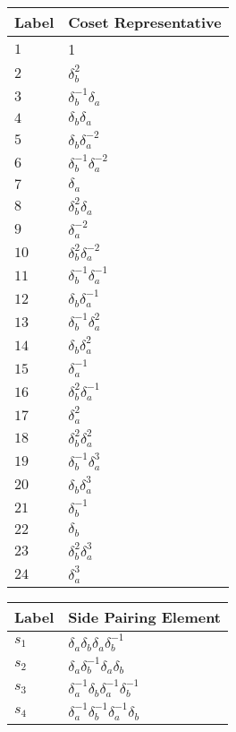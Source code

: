 \documentclass{article}
\begin{document}

\begin{center}
\begin{tabular}{ll}
\toprule
Label & Coset Representative\\
\midrule
$1$ & 1 \\
$2$ & $\delta_b^{2}$ \\
$3$ & $\delta_b^{-1}\delta_a^{}$ \\
$4$ & $\delta_b^{}\delta_a^{}$ \\
$5$ & $\delta_b^{}\delta_a^{-2}$ \\
$6$ & $\delta_b^{-1}\delta_a^{-2}$ \\
$7$ & $\delta_a^{}$ \\
$8$ & $\delta_b^{2}\delta_a^{}$ \\
$9$ & $\delta_a^{-2}$ \\
$10$ & $\delta_b^{2}\delta_a^{-2}$ \\
$11$ & $\delta_b^{-1}\delta_a^{-1}$ \\
$12$ & $\delta_b^{}\delta_a^{-1}$ \\
$13$ & $\delta_b^{-1}\delta_a^{2}$ \\
$14$ & $\delta_b^{}\delta_a^{2}$ \\
$15$ & $\delta_a^{-1}$ \\
$16$ & $\delta_b^{2}\delta_a^{-1}$ \\
$17$ & $\delta_a^{2}$ \\
$18$ & $\delta_b^{2}\delta_a^{2}$ \\
$19$ & $\delta_b^{-1}\delta_a^{3}$ \\
$20$ & $\delta_b^{}\delta_a^{3}$ \\
$21$ & $\delta_b^{-1}$ \\
$22$ & $\delta_b^{}$ \\
$23$ & $\delta_b^{2}\delta_a^{3}$ \\
$24$ & $\delta_a^{3}$ \\
\bottomrule
\end{tabular}
\hfill
\begin{tabular}{ll}
\toprule
Label & Side Pairing Element\\
\midrule
$s_{1}$ & $\delta_a^{}\delta_b^{}\delta_a^{}\delta_b^{-1}$ \\
$s_{2}$ & $\delta_a^{}\delta_b^{-1}\delta_a^{}\delta_b^{}$ \\
$s_{3}$ & $\delta_a^{-1}\delta_b^{}\delta_a^{-1}\delta_b^{-1}$ \\
$s_{4}$ & $\delta_a^{-1}\delta_b^{-1}\delta_a^{-1}\delta_b^{}$ \\

\end{tabular}
\end{center}
\end{document}
